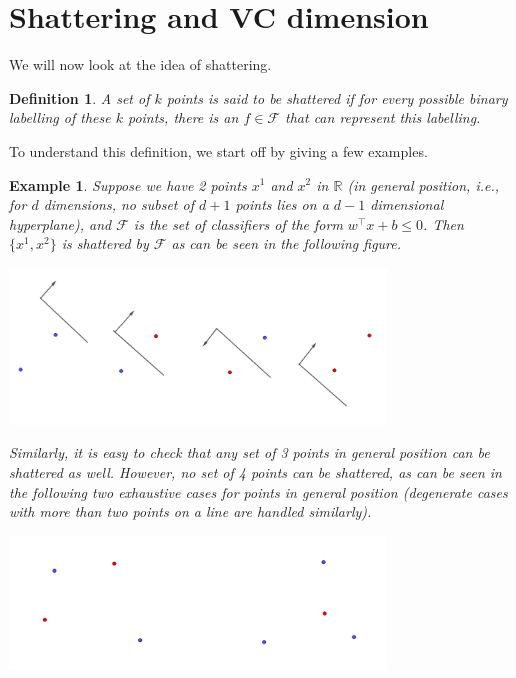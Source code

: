 \documentclass[11pt]{article}
\newtheorem{example}[theorem]{Example}
\newtheorem{definition}{Definition}[section]
\begin{document}
\section{Shattering and VC dimension}

We will now look at the idea of shattering.

\begin{definition}
    A set of $k$ points is said to be \emph{shattered} if for every possible binary labelling of these $k$ points, there is an $f \in \mathcal{F}$ that can represent this labelling.
\end{definition}
To understand this definition, we start off by giving a few examples.

\begin{example}
Suppose we have 2 points $x^1$ and $x^2$ in $\mathbb{R}$ (in general position, i.e., for $d$ dimensions, no subset of $d + 1$ points lies on a $d - 1$ dimensional hyperplane), and $\mathcal{F}$ is the set of classifiers of the form $w^\intercal x + b \le 0$. Then $\{x^1, x^2\}$ is shattered
by $\mathcal{F}$ as can be seen in the following figure.
\begin{center}
\includegraphics[width=0.75\textwidth]{shattering.png}
\end{center}
Similarly, it is easy to check that any set of 3 points in general position can be shattered as well. However, no set of 4 points can be shattered, as can be seen in the following two exhaustive
cases for points in general position (degenerate cases with more than two points on a line are handled similarly).
\begin{center}
\includegraphics[width=0.75\textwidth]{impossible-shattering.png}
\end{center}
\end{example}
\end{document}
